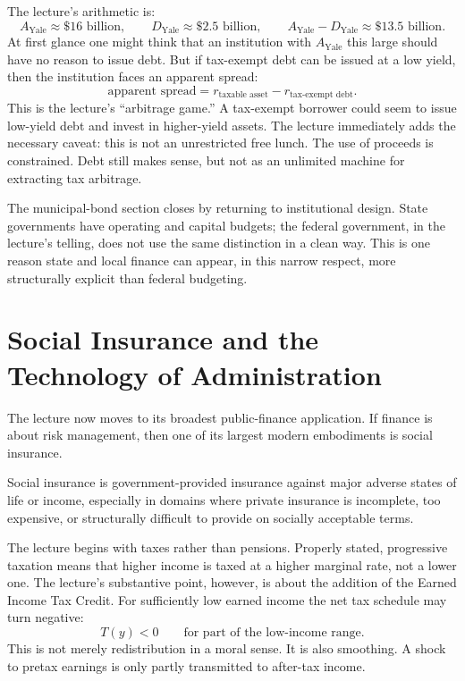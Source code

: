 The lecture's arithmetic is:
\begin{equation}
A_{\text{Yale}} \approx \$16\text{ billion},
\qquad
D_{\text{Yale}} \approx \$2.5\text{ billion},
\qquad
A_{\text{Yale}}-D_{\text{Yale}} \approx \$13.5\text{ billion}.
\end{equation}
At first glance one might think that an institution with \(A_{\text{Yale}}\) this large should have no reason to issue debt. But if tax-exempt debt can be issued at a low yield, then the institution faces an apparent spread:
\begin{equation}
\text{apparent spread}=r_{\text{taxable asset}}-r_{\text{tax-exempt debt}}.
\end{equation}
This is the lecture's ``arbitrage game.'' A tax-exempt borrower could seem to issue low-yield debt and invest in higher-yield assets. The lecture immediately adds the necessary caveat: this is not an unrestricted free lunch. The use of proceeds is constrained. Debt still makes sense, but not as an unlimited machine for extracting tax arbitrage.

The municipal-bond section closes by returning to institutional design. State governments have operating and capital budgets; the federal government, in the lecture's telling, does not use the same distinction in a clean way. This is one reason state and local finance can appear, in this narrow respect, more structurally explicit than federal budgeting.

\section{Social Insurance and the Technology of Administration}

The lecture now moves to its broadest public-finance application. If finance is about risk management, then one of its largest modern embodiments is social insurance.

\begin{definition}
Social insurance is government-provided insurance against major adverse states of life or income, especially in domains where private insurance is incomplete, too expensive, or structurally difficult to provide on socially acceptable terms.
\end{definition}

The lecture begins with taxes rather than pensions. Properly stated, progressive taxation means that higher income is taxed at a higher marginal rate, not a lower one. The lecture's substantive point, however, is about the addition of the Earned Income Tax Credit. For sufficiently low earned income the net tax schedule may turn negative:
\begin{equation}
T(y) < 0 \qquad \text{for part of the low-income range.}
\end{equation}
This is not merely redistribution in a moral sense. It is also smoothing. A shock to pretax earnings is only partly transmitted to after-tax income.

